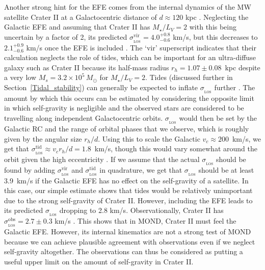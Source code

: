 \documentclass[fleqn,usenatbib,useAMS]{mnras} %
\begin{document}
Another strong hint for the EFE comes from the internal dynamics of the MW satellite Crater II at a Galactocentric distance of $d \approx 120$ kpc \citep{Torrealba_2016}. Neglecting the Galactic EFE and assuming that Crater II has $M_{\star}/L_V = 2$ with this being uncertain by a factor of 2, its predicted $\sigma_{_\text{LOS}}^{\text{vir}} = 4.0_{-0.6}^{+0.8}$ km/s, but this decreases to $2.1_{-0.6}^{+0.9}$ km/s once the EFE is included \citep{McGaugh_2016_CraterII}. The `vir' superscript indicates that their calculation neglects the role of tides, which can be important for an ultra-diffuse galaxy such as Crater II because its half-mass radius $r_h = 1.07 \pm 0.08$~kpc \citep[table~4 of][]{Torrealba_2016} despite a very low $M_s = 3.2 \times 10^5 \, M_\odot$ for $M_{\star}/L_V = 2$. Tides (discussed further in Section~\ref{Tidal_stability}) can generally be expected to inflate $\sigma_{_\text{LOS}}$ further \citep[figure~4 of][]{Brada_2000_tides}. The amount by which this occurs can be estimated by considering the opposite limit in which self-gravity is negligible and the observed stars are considered to be travelling along independent Galactocentric orbits. $\sigma_{_\text{LOS}}$ would then be set by the Galactic RC and the range of orbital phases that we observe, which is roughly given by the angular size $r_h/d$. Using this to scale the Galactic $v_c \approx 200$~km/s, we get that $\sigma_{_\text{LOS}}^{\text{tid}} \approx v_c r_h/d = 1.8$~km/s, though this would vary somewhat around the orbit given the high eccentricity \citep{Hefan_Li_2021}. If we assume that the actual $\sigma_{_\text{LOS}}$ should be found by adding $\sigma_{_\text{LOS}}^{\text{vir}}$ and $\sigma_{_\text{LOS}}^{\text{tid}}$ in quadrature, we get that $\sigma_{_\text{LOS}}$ should be at least 3.9~km/s if the Galactic EFE has no effect on the self-gravity of a satellite. In this case, our simple estimate shows that tides would be relatively unimportant due to the strong self-gravity of Crater II. However, including the EFE leads to its predicted $\sigma_{_\text{LOS}}$ dropping to 2.8 km/s. Observationally, Crater II has $\sigma_{_\text{LOS}}^{\text{obs}} = 2.7 \pm 0.3$ km/s \citep{Caldwell_2017}. This shows that in MOND, Crater II must feel the Galactic EFE. However, its internal kinematics are not a strong test of MOND because we can achieve plausible agreement with observations even if we neglect self-gravity altogether. The observations can thus be considered as putting a useful upper limit on the amount of self-gravity in Crater II.

\end{document}
